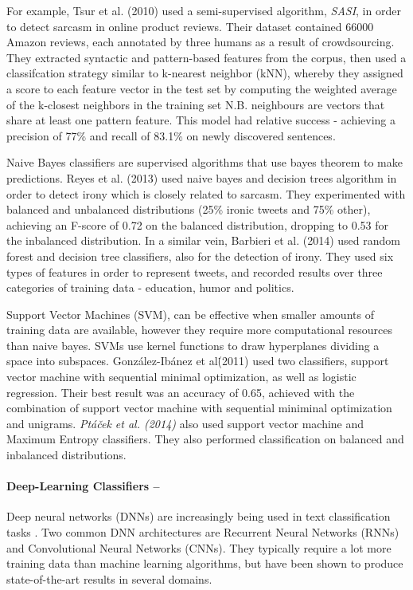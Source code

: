 \documentclass[12pt,a4paper]{article}
\begin{document}
For example, Tsur et al. (2010) \cite{tsur2010icwsm} used a semi-supervised algorithm, \textit{SASI}, in order to detect sarcasm in online product reviews. Their dataset contained 66000 Amazon reviews, each annotated by three humans as a result of crowdsourcing. They extracted syntactic and pattern-based features from the corpus, then used a classifcation strategy similar to k-nearest neighbor (kNN), whereby they assigned a score to each feature vector in the test set by computing the weighted average of the k-closest neighbors in the training set N.B. neighbours are vectors that share at least one pattern feature. This model had relative success - achieving a precision of 77\% and recall of 83.1\% on newly discovered sentences.

Naive Bayes classifiers are supervised algorithms that use bayes theorem to make predictions. Reyes et al. (2013) \cite{reyes2013multidimensional} used naive bayes and decision trees algorithm in order to detect irony which is closely related to sarcasm. They experimented with balanced and unbalanced distributions (25\% ironic tweets and 75\% other), achieving an F-score of 0.72 on the balanced distribution, dropping to 0.53 for the inbalanced distribution. In a similar vein, Barbieri et al. (2014) \cite{barbieri2014modelling} used random forest and decision tree classifiers, also for the detection of irony. They used six types of features in order to represent tweets, and recorded results over three categories of training data - education, humor and politics.

Support Vector Machines (SVM), can be effective when smaller amounts of training data are available, however they require more computational resources than naive bayes. SVMs use kernel functions to draw hyperplanes dividing a space into subspaces. Gonz{\'a}lez-Ib{\'a}nez et al\. (2011) \cite{gonzalez2011identifying} used two classifiers, support vector machine with sequential minimal optimization, as well as logistic regression. Their best result was an accuracy of 0.65, achieved with the combination of support vector machine with sequential miniminal optimization and unigrams. \textit{Pt{\'a}{\v{c}ek et al. (2014)}} \cite{ptavcek2014sarcasm} also used support vector machine and Maximum Entropy classifiers. They also performed classification on balanced and inbalanced distributions.

\paragraph{Deep-Learning Classifiers --}
Deep neural networks (DNNs) are increasingly being used in text classification tasks \cite{zhang2015character, poria2016deeper}. Two common DNN architectures are Recurrent Neural Networks (RNNs) and Convolutional Neural Networks (CNNs). They typically require a lot more training data than machine learning algorithms, but have been shown to produce state-of-the-art results in several domains.
\end{document}
